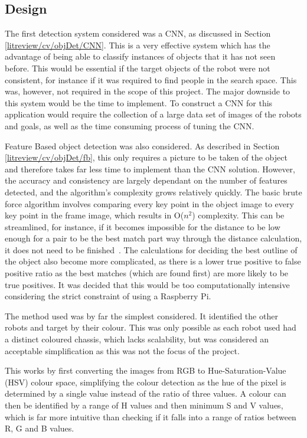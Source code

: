 \subsection{Design}\label{soft/cv/design}
The first detection system considered was a CNN, as discussed in Section
\ref{litreview/cv/objDet/CNN}. This is a very effective system which has
the advantage of
being able to classify instances of objects that it has not
seen before. This would be essential if the target objects of
the robot were not consistent, for instance if it was required to find
people in the search space. This was, however, not required
in the scope of this project. The major downside to this
system would be the time to implement. To construct a CNN for
this application would require the collection of a large data
set of images of the robots and goals, as well as the time
consuming process of tuning the CNN.

Feature Based object detection was also considered. As described in
Section \ref{litreview/cv/objDet/fb}, this only requires a picture to be
taken of the object and therefore takes far less time to
implement than the CNN solution. However, the accuracy and
consistency are largely dependant on the number of features
detected, and the algorithm's complexity grows relatively
quickly. The basic brute force algorithm involves comparing
every key point in the object image to every key point in the
frame image, which results in O($n^2$) complexity. This can be streamlined, for instance, if it becomes impossible
for the distance to be low enough for a pair to be the best
match part way through the distance calculation, it does not
need to be finished~\cite{opencv_library}. The calculations for deciding the best
outline of the object also become more complicated, as there
is a lower true positive to false positive ratio as the
best matches (which are found first) are more likely to be
true positives. It was decided that this would be too
computationally intensive considering the strict constraint of
using a Raspberry Pi.

The method used was by far the simplest considered. It identified the other robots and target
by their colour. This was only possible as each robot used had a distinct coloured chassis,
which lacks scalability, but was considered an acceptable simplification as this was not the
focus of the project.

This works by first converting the images from RGB to Hue-Saturation-Value (HSV) colour space,
simplifying the colour detection as the hue of the pixel is determined by a single value
instead of the ratio of three values. A colour can then be identified by a range of H values
and then minimum S and V values, which is far more intuitive than checking if it falls into a
range of ratios between R, G and B values.

